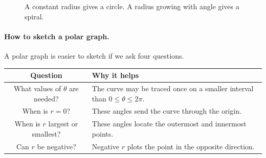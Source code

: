 \begin{figure}[h]
\centering
\begin{minipage}{0.45\textwidth}
\centering
{}
\end{minipage}
\hfill
\begin{minipage}{0.45\textwidth}
\centering
{}
\end{minipage}
\caption{A constant radius gives a circle.  A radius growing with angle gives a spiral.}
\label{fig:circle-and-spiral-polar}
\end{figure}

\paragraph{How to sketch a polar graph.}
A polar graph is easier to sketch if we ask four questions.

\begin{center}
\begin{tabular}{c|p{}}
\textbf{Question} & \textbf{Why it helps} \\ \hline
What values of \(\theta\) are needed? & The curve may be traced once on a smaller interval than \(0\le\theta\le2\pi\). \\[3pt]
When is \(r=0\)? & These angles send the curve through the origin. \\[3pt]
When is \(r\) largest or smallest? & These angles locate the outermost and innermost points. \\[3pt]
Can \(r\) be negative? & Negative \(r\) plots the point in the opposite direction.
\end{tabular}
\end{center}

